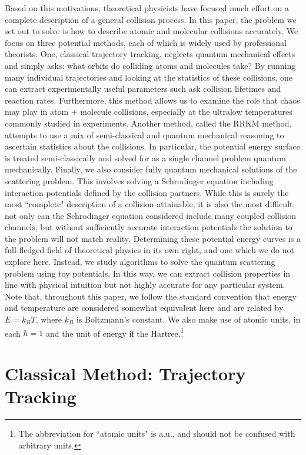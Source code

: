 \documentclass[%
 reprint,
 amsmath,amssymb,
 aps,
 nofootinbib
]{revtex4-1}
\begin{document}
Based on this motivations, theoretical physicists have focused much effort on a complete description of a general collision process. In this paper, the problem we set out to solve is how to describe atomic and molecular collisions accurately. We focus on three potential methods, each of which is widely used by professional theorists. One, classical trajectory tracking, neglects quantum mechanical effects and simply asks: what orbits do colliding atoms and molecules take? By running many individual trajectories and looking at the statistics of these collisions, one can extract experimentally useful parameters such ask collision lifetimes and reaction rates. Furthermore, this method allows us to examine the role that chaos may play in atom + molecule collisions, especially at the ultralow temperatures commonly studied in experiments. Another method, called the RRKM method, attempts to use a mix of semi-classical and quantum mechanical reasoning to ascertain statistics about the collisions. In particular, the potential energy surface is treated semi-classically and solved for as a single channel problem quantum mechanically. Finally, we also consider fully quantum mechanical solutions of the scattering problem. This involves solving a Schrodinger equation including interaction potentials defined by the collision partners. While this is surely the most ``complete" description of a collision attainable, it is also the most difficult: not only can the Schrodinger equation considered include many coupled collision channels, but without sufficiently accurate interaction potentials the solution to the problem will not match reality. Determining these potential energy curves is a full-fledged field of theoretical physics in its own right, and one which we do not explore here. Instead, we study algorithms to solve the quantum scattering problem using toy potentials. In this way, we can extract collision properties in line with physical intuition but not highly accurate for any particular system. Note that, throughout this paper, we follow the standard convention that energy and temperature are considered somewhat equivalent here and are related by $E = k_B T$, where $k_B$ is Boltzmann's constant. We also make use of atomic units, in each $\hbar = 1$ and the unit of energy if the Hartree.\footnote{The abbreviation for ``atomic units" is a.u., and should not be confused with arbitrary units.}


\section{\label{sec:ClassicalTraj} Classical Method: Trajectory Tracking}
\end{document}

